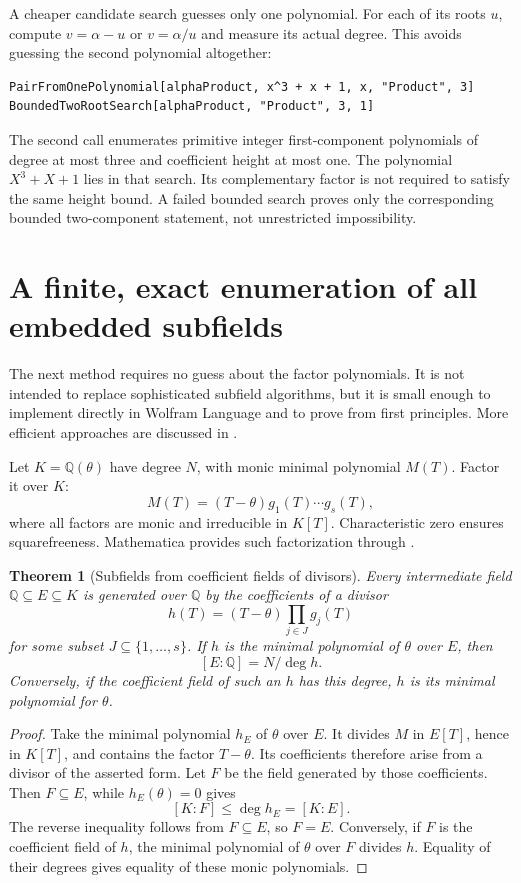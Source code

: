 \documentclass[11pt]{article}
\newcommand{\Q}{\mathbb Q}
\newcommand{\code}[1]{\texttt{\detokenize{#1}}}
\newtheorem{theorem}{Theorem}[section]
\theoremstyle{definition}\newtheorem{definition}[theorem]{Definition}
\theoremstyle{remark}\newtheorem{remark}[theorem]{Remark}
\begin{document}
A cheaper candidate search guesses only one polynomial. For each of its roots
$u$, compute $v=\alpha-u$ or $v=\alpha/u$ and measure its actual degree. This
avoids guessing the second polynomial altogether:
\begin{lstlisting}
PairFromOnePolynomial[alphaProduct, x^3 + x + 1, x, "Product", 3]
BoundedTwoRootSearch[alphaProduct, "Product", 3, 1]
\end{lstlisting}
The second call enumerates primitive integer first-component polynomials of
degree at most three and coefficient height at most one. The polynomial
$X^3+X+1$ lies in that search. Its complementary factor is not required to
satisfy the same height bound. A failed bounded search proves only the
corresponding bounded two-component statement, not unrestricted impossibility.

\section{A finite, exact enumeration of all embedded subfields}
\label{sec:subfields}
The next method requires no guess about the factor polynomials. It is not
intended to replace sophisticated subfield algorithms, but it is small enough
to implement directly in Wolfram Language and to prove from first principles.
More efficient approaches are discussed in \cite{subfields,pari}.

Let $K=\Q(\theta)$ have degree $N$, with monic minimal polynomial $M(T)$.
Factor it over $K$:
\[
 M(T)=(T-\theta)g_1(T)\cdots g_s(T),
\]
where all factors are monic and irreducible in $K[T]$. Characteristic zero
ensures squarefreeness. Mathematica provides such factorization through
\code{FactorList[..., Extension -> theta]} \cite{factor}.

\begin{theorem}[Subfields from coefficient fields of divisors]\label{thm:subfields}
Every intermediate field $\Q\subseteq E\subseteq K$ is generated over $\Q$ by
the coefficients of a divisor
\[
 h(T)=(T-\theta)\prod_{j\in J}g_j(T)
\]
for some subset $J\subseteq\{1,\ldots,s\}$. If $h$ is the minimal polynomial
of $\theta$ over $E$, then
\[
 [E:\Q]=N/\deg h.
\]
Conversely, if the coefficient field of such an $h$ has this degree, $h$ is
its minimal polynomial for $\theta$.
\end{theorem}
\begin{proof}
Take the minimal polynomial $h_E$ of $\theta$ over $E$. It divides $M$ in
$E[T]$, hence in $K[T]$, and contains the factor $T-\theta$. Its coefficients
therefore arise from a divisor of the asserted form.
Let $F$ be the field generated by those coefficients. Then $F\subseteq E$,
while $h_E(\theta)=0$ gives
\[
 [K:F]\le\deg h_E=[K:E].
\]
The reverse inequality follows from $F\subseteq E$, so $F=E$.
Conversely, if $F$ is the coefficient field of $h$, the minimal polynomial of
$\theta$ over $F$ divides $h$. Equality of their degrees gives equality of
these monic polynomials.
\end{proof}
\end{document}
